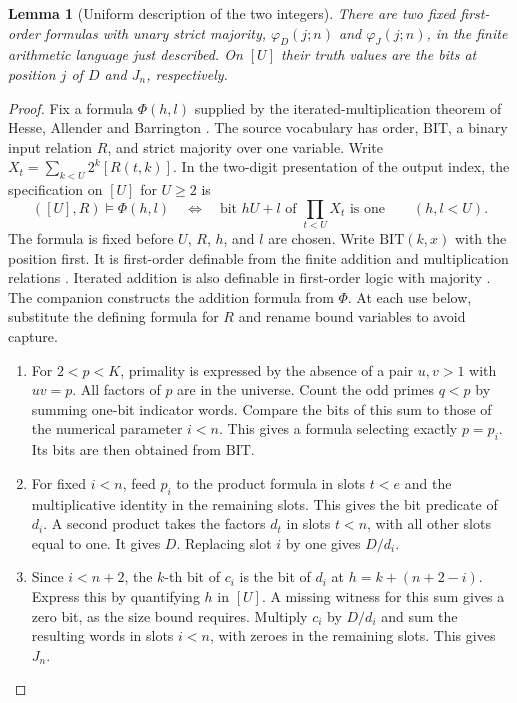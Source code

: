 \documentclass[11pt,letterpaper]{article}
\newtheorem{lemma}[theorem]{Lemma}
\numberwithin{equation}{section}
\begin{document}
\begin{lemma}[Uniform description of the two integers]\label{lem:width-formulas}
There are two fixed first-order formulas with unary strict majority,
\(\varphi_D(j;n)\) and \(\varphi_J(j;n)\), in the finite arithmetic
language just described. On \([U]\) their truth values are the bits at
position \(j\) of \(D\) and \(J_n\), respectively.
\end{lemma}
\begin{proof}
Fix a formula $\Phi(h,l)$ supplied by the iterated-multiplication theorem of Hesse, Allender and Barrington \cite[Sections~2 and 2.3, Cor.~6.3]{hab}. The source vocabulary has order, $\mathrm{BIT}$, a binary input relation $R$, and strict majority over one variable. Write $X_t=\sum_{k<U}2^k[R(t,k)]$. In the two-digit presentation of the output index, the specification on $[U]$ for $U\ge2$ is
\[
 ([U],R)\models\Phi(h,l)
 \quad\Longleftrightarrow\quad
 \text{bit }hU+l\text{ of }\prod_{t<U}X_t\text{ is one}
 \qquad(h,l<U).
\]
The formula is fixed before $U$, $R$, $h$, and $l$ are chosen. Write $\mathrm{BIT}(k,x)$ with the position first. It is first-order definable from the finite addition and multiplication relations \cite[Cor.~6.15]{libkin}. Iterated addition is also definable in first-order logic with majority \cite[proof of Lemma~4.1]{hab}. The companion constructs the addition formula from $\Phi$. At each use below, substitute the defining formula for $R$ and rename bound variables to avoid capture.

\begin{enumerate}
\item For \(2<p<K\), primality is expressed by the absence of
      a pair \(u,v>1\) with \(uv=p\). All factors of \(p\) are in the universe.
      Count the odd primes \(q<p\) by summing one-bit indicator words.
      Compare the bits of this sum to those of the numerical parameter
      \(i<n\). This gives a formula selecting exactly \(p=p_i\). Its bits are then obtained from \(\mathrm{BIT}\).
\item For fixed \(i<n\), feed \(p_i\) to the product formula in slots
      \(t<e\) and the multiplicative identity in the remaining slots.
      This gives the bit predicate of \(d_i\). A second product takes
      the factors \(d_t\) in slots \(t<n\), with all other slots equal
      to one. It gives \(D\). Replacing slot \(i\) by one gives \(D/d_i\).
\item Since \(i<n+2\), the \(k\)-th bit of \(c_i\) is the bit of \(d_i\)
      at \(h=k+(n+2-i)\). Express this by quantifying \(h\) in \([U]\). A missing witness for this sum gives a zero bit, as the size bound requires.
      Multiply \(c_i\) by \(D/d_i\) and sum the resulting words in
      slots \(i<n\), with zeroes in the remaining slots. This gives \(J_n\).
\end{enumerate}


\end{proof}
\end{document}
